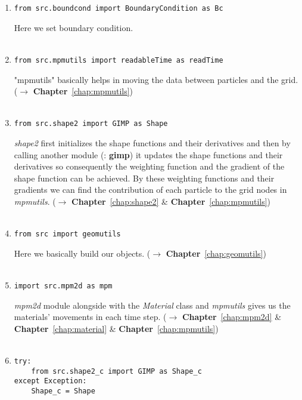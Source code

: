 \documentclass[11pt,fleqn]{book} %
\begin{document}
\begin{enumerate}
\item 
\begin{lstlisting}
from src.boundcond import BoundaryCondition as Bc
\end{lstlisting}
Here we set boundary condition.\\ \\
\item 
\begin{lstlisting}
from src.mpmutils import readableTime as readTime
\end{lstlisting}
"mpmutils" basically helps in moving the data between particles and the grid. ($\rightarrow$ \textbf{Chapter}~\ref{chap:mpmutils})\\ \\
\item 
\begin{lstlisting}
from src.shape2 import GIMP as Shape    
\end{lstlisting}
\emph{shape2} first initializes the shape functions and their derivatives and then by calling another module (: \textbf{gimp}) it updates the shape functions and their derivatives so consequently the weighting function and the gradient of the shape function can be achieved. By these weighting functions and their gradients we can find the
contribution of each particle to the grid nodes in \emph{mpmutils}. ($\rightarrow$ \textbf{Chapter}~\ref{chap:shape2} \& \textbf{Chapter}~\ref{chap:mpmutils}) \\ \\
\item 
\begin{lstlisting}
from src import geomutils
\end{lstlisting}
Here we basically build our objects. ($\rightarrow$ \textbf{Chapter}~\ref{chap:geomutils})\\ \\
\item \begin{lstlisting}
import src.mpm2d as mpm
\end{lstlisting}
\emph{mpm2d} module alongside with the \emph{Material} class and \emph{mpmutils} gives us the materials' movements in each time step. ($\rightarrow$ \textbf{Chapter}~\ref{chap:mpm2d} \& \textbf{Chapter}~\ref{chap:material} \& \textbf{Chapter}~\ref{chap:mpmutils}) \\ \\
\item 
\begin{lstlisting}
try:
    from src.shape2_c import GIMP as Shape_c
except Exception:
    Shape_c = Shape
\end{lstlisting}

\end{enumerate}
\end{document}
